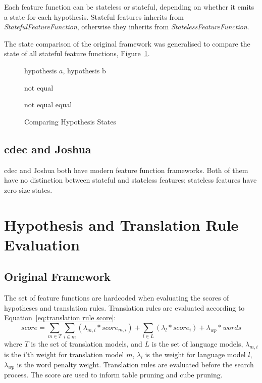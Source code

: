 \documentclass{pbml}
\begin{document}
Each feature function can be stateless or stateful, depending on whether it emits a state for each hypothesis. Stateful features inherits from \emph{StatefulFeatureFunction}, otherwise they inherits from \emph{StatelessFeatureFunction}.

The state comparison of the original framework was generalised to compare the state of all stateful feature functions, Figure~\ref{algo:CompareHypoStates.new}.

\begin{figure} [h!]
\small 
\begin{algorithmic}
\REQUIRE hypothesis $a$, hypothesis b

	\RETURN not equal
       \ENDIF
       
	    \RETURN not equal
	 \ENDIF
        \ENDFOR
        \RETURN equal

\end{algorithmic}
\caption{Comparing Hypothesis States}
\label{algo:CompareHypoStates.new}
\end{figure} 
        
\subsection{cdec and Joshua}
cdec and Joshua both have modern feature function frameworks. Both of them have no distinction between stateful and stateless features; stateless features have zero size states.

\section{Hypothesis and Translation Rule Evaluation}
\subsection{Original Framework}
The set of feature functions are hardcoded when evaluating the scores of hypotheses and translation rules. Translation rules are evaluated according to Equation~\ref{eq:translation rule score}:
\begin{equation}
  score = \sum_{m \in T} \sum_{i \in m} (\lambda_{m,i} * score_{m,i}) + \sum_{l  \in L} (\lambda_l * score_i) + \lambda_{wp} * words
\label{eq:translation rule score}
\end{equation}
where $T$ is the set of translation models, and $L$ is the set of language models, $\lambda_{m,i}$ is the i'th weight for translation model $m$, $\lambda_l$ is the weight for language model $l$, $\lambda_{wp}$ is the word penalty weight. Translation rules are evaluated before the search process. The score are used to inform table pruning and cube pruning.
\end{document}

